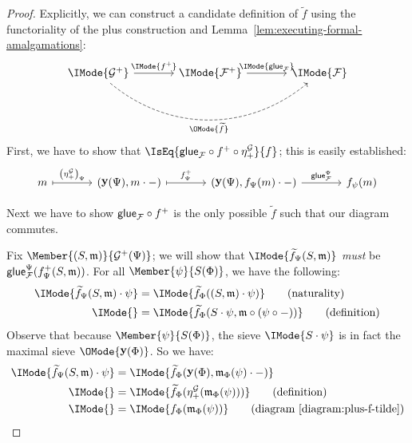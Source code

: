 \documentclass{article}
\newcommand\AIsEq[2]{\IMode{#1} &=\IMode{#2}}
\DeclareMathOperator\OpYoneda{\mathbf{y}}
\newcommand\Yoneda[1]{\OpYoneda({#1})}
\newcommand\Plus[1]{{#1}^+}
\begin{document}
\begin{proof}
  Explicitly, we can construct a candidate definition of
  $\widetilde{f}$ using the functoriality of the plus construction and
  Lemma~\ref{lem:executing-formal-amalgamations}:
  \[
    \begin{tikzcd}[sep=large]
      \IMode{\Plus{\mathcal{G}}}
      \arrow[r,"\IMode{\Plus{f}}"]
      \arrow[rr,swap,dashed,bend right=40,"\OMode{\widetilde{f}}"]
      &
      \IMode{\Plus{\mathcal{F}}}
      \arrow[r,"\IMode{\Glue{\mathcal{F}}}"]
      &
      \IMode{\mathcal{F}}
    \end{tikzcd}
  \]
%
  First, we have to show that
  $\IsEq{\Glue{\mathcal{F}}\circ\Plus{f}\circ\eta_+^{\mathcal{G}}}{f}$;
  this is easily established:
  \[
    \begin{tikzcd}[sep=large]
      m
      \arrow[r,mapsto,"\left(\eta_+^{\mathcal{G}}\right)_\Psi"]
      &
      (\Yoneda{\Psi},m\cdot-)
      \arrow[r,mapsto,"\Plus{f}_\Psi"]
      &
      (\Yoneda{\Psi},f_\Psi(m)\cdot-)
      \arrow[r,"\Glue{\mathcal{F}}^\Psi"]
      &
      f_\psi(m)
    \end{tikzcd}
  \]

  Next we have to show $\Glue{\mathcal{F}}\circ\Plus{f}$ is the only
  possible $\widetilde{f}$ such that our diagram commutes.

  Fix $\Member{(S,\mathfrak{m})}{\Plus{\mathcal{G}}(\Psi)}$; we will
  show that $\IMode{\widetilde{f}_\Psi(S,\mathfrak{m})}$ \emph{must}
  be $\Glue{\mathcal{F}}^\Psi(\Plus{f}_\Psi(S,\mathfrak{m}))$.
%
  For all $\Member{\psi}{S(\Phi)}$, we have the following:
  \begin{align*}
    \AIsEq{
      \widetilde{f}_\Psi(S,\mathfrak{m})\cdot\psi
    }{
      \widetilde{f}_\Phi((S,\mathfrak{m})\cdot\psi)
    }
    \tag{naturality}
    \\
    \AIsEq{
    }{
      \widetilde{f}_\Phi(S\cdot\psi,\mathfrak{m}\circ(\psi\circ-))
    }
    \tag{definition}
  \end{align*}
%
  Observe that because $\Member{\psi}{S(\Phi)}$, the sieve
  $\IMode{S\cdot\psi}$ is in fact the maximal sieve
  $\OMode{\Yoneda{\Phi}}$. So we have:
  \begin{align*}
    \AIsEq{
      \widetilde{f}_\Psi(S,\mathfrak{m})\cdot\psi
    }{
      \widetilde{f}_\Phi(\Yoneda{\Phi},\mathfrak{m}_\Phi(\psi)\cdot-)
    }
    \\
    \AIsEq{
    }{
      \widetilde{f}_\Phi(\eta_+^{\mathcal{G}}(\mathfrak{m}_\Phi(\psi)))
    }
    \tag{definition}
    \\
    \AIsEq{
    }{
      f_\Phi(\mathfrak{m}_\Phi(\psi))
    }
    \tag{diagram~\ref{diagram:plus-f-tilde}}
  \end{align*}


\end{proof}
\end{document}

